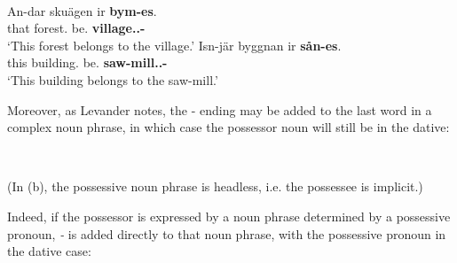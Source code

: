 \ea%
\\
	\ea
		\gll An-dar  skuägen  ir  \textbf{bym-es}.\\
			that  forest.{}  be.{\prs}  \textbf{village.{}.{\dat}-{\poss}}\\
		\glt ‘This forest belongs to the village.’
	\ex
		\gll Isn-jär  byggnan  ir  \textbf{sån-es}.\\
		this  building.{}  be.{\prs}  \textbf{saw-mill.{}.{\dat}-{\poss}}\\
		\glt  ‘This building belongs to the saw-mill.’
	\z
\z 

Moreover, as Levander notes, the \nobreakdash- ending may be added to the last word in a complex noun phrase, in which case the possessor noun will still be in the dative:

\ea 
{}\\
	\z
\z 


(In (b), the possessive noun phrase is headless, i.e. the possessee is implicit.) 

Indeed, if the possessor is expressed by a noun phrase determined by a possessive pronoun,\textit{ {}-} is added directly to that noun phrase, with the possessive pronoun in the dative case:

